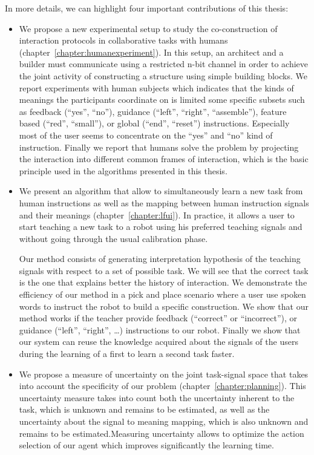 In more details, we can highlight four important contributions of this thesis:

\begin{itemize}

\item We propose a new experimental setup to study the co-construction of interaction protocols in collaborative tasks with humans \cite{vollmer2014studying} (chapter~\ref{chapter:humanexperiment}). In this setup, an architect and a builder must communicate using a restricted n-bit channel in order to achieve the joint activity of constructing a structure using simple building blocks. We report experiments with human subjects which indicates that the kinds of meanings the participants coordinate on is limited some specific subsets such as feedback (``yes'', ``no''), guidance (``left'', ``right'', ``assemble''), feature based (``red'', ``small''), or global (``end'', ``reset'') instructions. Especially most of the user seems to concentrate on the ``yes'' and ``no'' kind of instruction. Finally we report that humans solve the problem by projecting the interaction into different common frames of
interaction, which is the basic principle used in the algorithms presented in this thesis.

\item  We present an algorithm that allow to simultaneously learn a new task from human instructions as well as the mapping between human instruction signals and their meanings \cite{grizou2013interactive,grizou2013robot,grizou2014robot,grizou2014calibration,grizou2014interactive} (chapter~\ref{chapter:lfui}). In practice, it allows a user to start teaching a new task to a robot using his preferred teaching signals and without going through the usual calibration phase.  

Our method consists of generating interpretation hypothesis of the teaching signals with respect to a set of possible task. We will see that the correct task is the one that explains better the history of interaction. We demonstrate the efficiency of our method in a pick and place scenario where a user use spoken words to instruct the robot to build a specific construction. We show that our method works if the teacher provide feedback (``correct'' or ``incorrect''), or guidance (``left'', ``right'', \ldots) instructions to our robot. Finally we show that our system can reuse the knowledge acquired about the signals of the users during the learning of a first to learn a second task faster.

\item We propose a measure of uncertainty on the joint task-signal space that takes into account the specificity of our problem \cite{grizou2014calibration,grizou2014interactive} (chapter~\ref{chapter:planning}). This uncertainty measure takes into count both the uncertainty inherent to the task, which is unknown and remains to be estimated, as well as the uncertainty about the signal to meaning mapping, which is also unknown and remains to be estimated.Measuring uncertainty allows to optimize the action selection of our agent which improves significantly the learning time. 


\end{itemize}
